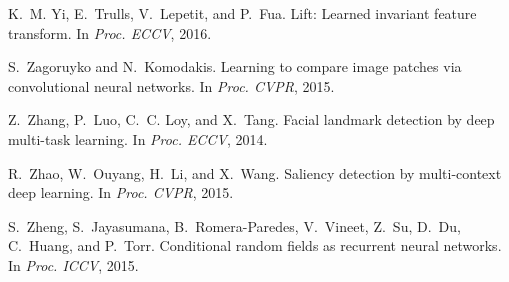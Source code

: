 \documentclass[10pt,twocolumn,letterpaper]{article}
\begin{document}
\begin{thebibliography}{100}
	K.~M. Yi, E.~Trulls, V.~Lepetit, and P.~Fua.
	\newblock Lift: Learned invariant feature transform.
	\newblock In {\em Proc. {ECCV}}, 2016.
	
	S.~Zagoruyko and N.~Komodakis.
	\newblock Learning to compare image patches via convolutional neural networks.
	\newblock In {\em Proc. {CVPR}}, 2015.
	
	Z.~Zhang, P.~Luo, C.~C. Loy, and X.~Tang.
	\newblock Facial landmark detection by deep multi-task learning.
	\newblock In {\em Proc. {ECCV}}, 2014.
	
	R.~Zhao, W.~Ouyang, H.~Li, and X.~Wang.
	\newblock Saliency detection by multi-context deep learning.
	\newblock In {\em Proc. {CVPR}}, 2015.
	
	S.~Zheng, S.~Jayasumana, B.~Romera-Paredes, V.~Vineet, Z.~Su, D.~Du, C.~Huang,
	and P.~Torr.
	\newblock Conditional random fields as recurrent neural networks.
	\newblock In {\em Proc. {ICCV}}, 2015.
	
\end{thebibliography}
\end{document}
